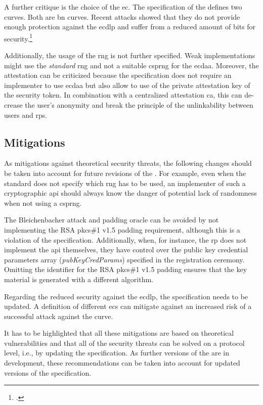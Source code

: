A further critique is the choice of the \gls{ec}. The specification of the \wa{} defines two curves. Both are \gls{bn} curves. Recent attacks showed that they do not provide enough protection against the \gls{ecdlp} and suffer from a reduced amount of bits for security.\footcites[See][562]{10.1007/978-3-662-53018-4_20}

Additionally, the usage of the \gls{rng} is not further specified. Weak implementations might use the \textit{standard} \gls{rng} and not a suitable \gls{csprng} for the \gls{ecdaa}. Moreover, the attestation can be criticized because the specification does not require an implementer to use \gls{ecdaa} but also allow to use of the private attestation key of the security token. In combination with a centralized attestation \gls{ca}, this can de-crease the user's anonymity and break the principle of the unlinkability between users and \glspl{rp}.

\subsection{Mitigations}

As mitigations against theoretical security threats, the following changes should be taken into account for future revisions of the \wa{}. For example, even when the standard does not specify which \gls{rng} has to be used, an implementer of such a cryptographic \gls{api} should always know the danger of potential lack of randomness when not using a \gls{csprng}. 

The Bleichenbacher attack and padding oracle can be avoided by not implementing the RSA \gls{pkcs}\#1 v1.5 padding requirement, although this is a violation of the specification. Additionally, when, for instance, the \gls{rp} does not implement the \gls{api} themselves, they have control over the public key credential parameters array (\textit{pubKeyCredParams}) specified in the registration ceremony. Omitting the identifier for the RSA \gls{pkcs}\#1 v1.5 padding ensures that the key material is generated with a different algorithm.

Regarding the reduced security against the \gls{ecdlp}, the specification needs to be updated. A definition of different \glspl{ec} can mitigate against an increased risk of a successful attack against the curve.

It has to be highlighted that all these mitigations are based on theoretical vulnerabilities and that all of the security threats can be solved on a protocol level, i.e., by updating the specification. As further versions of the \wa{} are in development, these recommendations can be taken into account for updated versions of the specification.
